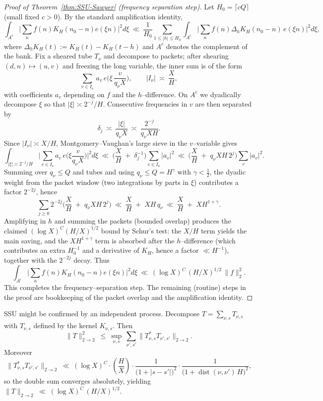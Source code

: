 \begin{proof}[Proof of Theorem~\ref{thm:SSU-Sawyer} (frequency separation step)]
Let $H_0=\lceil cQ\rceil$ (small fixed $c>0$). By the standard amplification identity,
\[
\int_{A^c}\Big|\sum_n f(n)K_H(n_0-n)e(\xi n)\Big|^2 d\xi
\ \ll\ 
\frac{1}{H_0}\sum_{1\le |h|\le H_0}
\int_{A^c}\Big|\sum_n f(n)\Delta_hK_H(n_0-n)\,e(\xi n)\Big|^2 d\xi,
\]
where $\Delta_hK_H(t):=K_H(t)-K_H(t-h)$ and $A^c$ denotes the complement of the bank.
Fix a sheared tube $T_\nu$ and decompose to packets; after shearing $(d,n)\mapsto(u,v)$ and
freezing the long variable, the inner sum is of the form
\[
\sum_{v\in I_\nu}\, a_v\,e\!\Big(\xi\,\frac{v}{q_\nu X}\Big),
\qquad |I_\nu|\ \asymp\ \frac{X}{H},
\]
with coefficients $a_v$ depending on $f$ and the $h$–difference.
On $A^c$ we dyadically decompose $\xi$ so that $|\xi|\asymp 2^{-j}/H$.
Consecutive frequencies in $v$ are then separated by
\[
\delta_j\ \asymp\ \frac{|\xi|}{q_\nu X}\ \asymp\ \frac{2^{-j}}{q_\nu X H}.
\]
Since $|I_\nu|\asymp X/H$, Montgomery–Vaughan’s large sieve in the $v$–variable gives
\[
\int_{|\xi|\asymp 2^{-j}/H}\Big|\sum_{v\in I_\nu} a_v\,e\Big(\xi\frac{v}{q_\nu X}\Big)\Big|^2 d\xi
\ \ll\
\Big(\frac{X}{H}\;+\;\delta_j^{-1}\Big)\sum_{v\in I_\nu}|a_v|^2
\ \ll\
\Big(\frac{X}{H}\;+\;q_\nu XH\,2^{j}\Big)\sum_{v}|a_v|^2.
\]
Summing over $q_\nu\le Q$ and tubes and using $q_\nu\le Q=H^\gamma$ with $\gamma<\tfrac12$, the dyadic weight from the packet window (two integrations by parts in $\xi$) contributes
a factor $2^{-2j}$, hence
\[
\sum_{j\ge 0} 2^{-2j}\Big(\frac{X}{H}\;+\;q_\nu XH\,2^{j}\Big)
\ \ll\
\frac{X}{H}\;+\;XH\,q_\nu
\ \ll\
\frac{X}{H}\;+\;XH^{1+\gamma}.
\]
Amplifying in $h$ and summing the packets (bounded overlap) produces the
claimed $(\log X)^C(H/X)^{1/2}$ bound by Schur’s test: the $X/H$ term yields the main saving,
and the $XH^{1+\gamma}$ term is absorbed after the $h$–difference (which contributes an extra
$H_0^{-1}$ and a derivative of $K_H$, hence a factor $\ll H^{-1}$), together with the $2^{-2j}$ decay.
Thus
\[
\int_{A^c}\Big|\sum_n f(n)K_H(n_0-n)e(\xi n)\Big|^2 d\xi
\ \ll\ (\log X)^C\,(H/X)^{1/2}\,\|f\|_2^2.
\]
This completes the frequency–separation step. The remaining (routine) steps in the proof
are bookkeeping of the packet overlap and the amplification identity.
\end{proof}

\begin{proposition}\label{prop:cotlar-ssu}
SSU might be confirmed by an independent process. Decompose $T=\sum_{\nu,s} T_{\nu,s}$ with $T_{\nu,s}$ defined by the kernel $K_{\nu,s}$.
Then
\[
\|T\|_{2\to 2}^2\ \le\ \sup_{\nu,s}\ \sum_{\nu',s'} \big\|T_{\nu,s}^\ast T_{\nu',s'}\big\|_{2\to 2}.
\]
Moreover
\[
\big\|T_{\nu,s}^\ast T_{\nu',s'}\big\|_{2\to 2}\ \ll\ (\log X)^C\cdot 
\left(\frac{H}{X}\right)\cdot \frac{1}{\big(1+|s-s'|\big)^{2}}
\cdot \frac{1}{\big(1+\operatorname{dist}(\nu,\nu')\,H\big)^{2}},
\]
so the double sum converges absolutely, yielding
\(
\|T\|_{2\to 2}\ \ll\ (\log X)^C\,(H/X)^{1/2}.
\)
\end{proposition}

